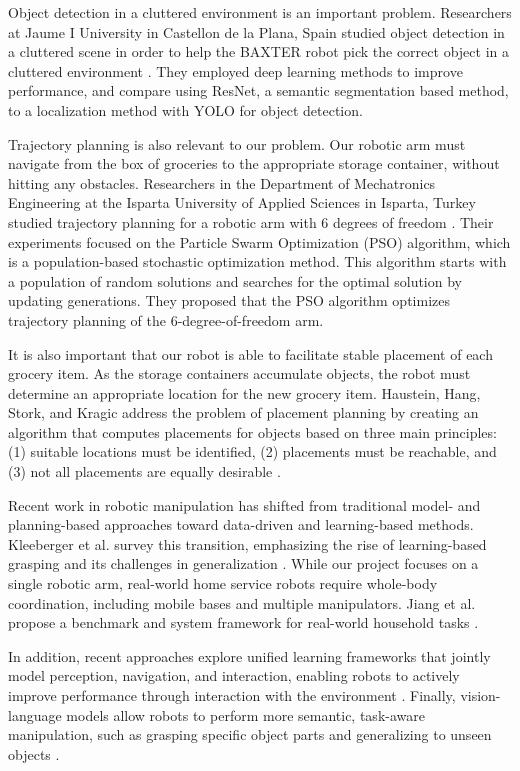 \documentclass{article}
\begin{document}
Object detection in a cluttered environment is an important problem. Researchers at Jaume I University in Castellon de la Plana, Spain studied object detection in a cluttered scene in order to help the BAXTER robot pick the correct object in a cluttered environment \cite{10.1145/3164541.3164628}. They employed deep learning methods to improve performance, and compare using ResNet, a semantic segmentation based method, to a localization method with YOLO for object detection. 

Trajectory planning is also relevant to our problem. Our robotic arm must navigate from the box of groceries to the appropriate storage container, without hitting any obstacles. Researchers in the Department of Mechatronics Engineering at the Isparta University of Applied Sciences in Isparta, Turkey studied trajectory planning for a robotic arm with 6 degrees of freedom \cite{EKREM2023106099}. Their experiments focused on the Particle Swarm Optimization (PSO) algorithm, which is a population-based stochastic optimization method. This algorithm starts with a population of random solutions and searches for the optimal solution by updating generations. They proposed that the PSO algorithm optimizes trajectory planning of the 6-degree-of-freedom arm. 

It is also important that our robot is able to facilitate stable placement of each grocery item. As the storage containers accumulate objects, the robot must determine an appropriate location for the new grocery item. Haustein, Hang, Stork, and Kragic address the problem of placement planning by creating an algorithm that computes placements for objects based on three main principles: (1) suitable locations must be identified, (2) placements must be reachable, and (3) not all placements are equally desirable \cite{8967732}.

Recent work in robotic manipulation has shifted from traditional model- and planning-based approaches toward data-driven and learning-based methods. Kleeberger et al. survey this transition, emphasizing the rise of learning-based grasping and its challenges in generalization \cite{kleeberger2020survey}. While our project focuses on a single robotic arm, real-world home service robots require whole-body coordination, including mobile bases and multiple manipulators. Jiang et al. propose a benchmark and system framework for real-world household tasks \cite{jiang2025behavior}.

In addition, recent approaches explore unified learning frameworks that jointly model perception, navigation, and interaction, enabling robots to actively improve performance through interaction with the environment \cite{uppal2024spin}. Finally, vision-language models allow robots to perform more semantic, task-aware manipulation, such as grasping specific object parts and generalizing to unseen objects \cite{oort2025open}.
\end{document}
